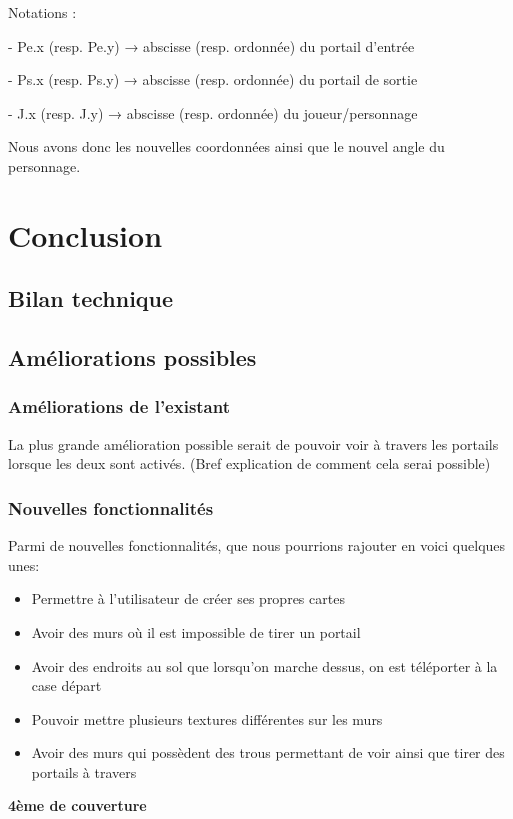 \documentclass[11pt]{article}
\begin{document}
Notations :

- Pe.x (resp. Pe.y) → abscisse (resp. ordonnée) du portail d’entrée

- Ps.x (resp. Ps.y) → abscisse (resp. ordonnée) du portail de sortie

- J.x (resp. J.y) → abscisse (resp. ordonnée) du joueur/personnage

Nous avons donc les nouvelles coordonnées ainsi que le nouvel angle du personnage.

\section{Conclusion}
\subsection{Bilan technique}
\subsection{Améliorations possibles}
\subsubsection{Améliorations de l'existant}

La plus grande amélioration possible serait de pouvoir voir à travers les portails
lorsque les deux sont activés. (Bref explication de comment cela serai possible)

\subsubsection{Nouvelles fonctionnalités}

Parmi de nouvelles fonctionnalités, que nous pourrions rajouter en voici quelques unes:
\begin{itemize}
	\item Permettre à l'utilisateur de créer ses propres cartes
	\item Avoir des murs où il est impossible de tirer un portail
	\item Avoir des endroits au sol que lorsqu'on marche dessus, on est téléporter à la case départ
	\item Pouvoir mettre plusieurs textures différentes sur les murs
	\item Avoir des murs qui possèdent des trous permettant de voir ainsi que tirer des portails à travers
\end{itemize}





\newpage
\thispagestyle{empty}
\begin{center}
\textbf{4ème de couverture}
\end{center}
\end{document}
